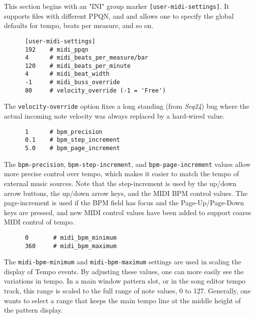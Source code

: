    This section begins with an
   "INI" group marker \texttt{[user-midi-settings]}.
   It supports files with different PPQN, and and allows one to specify the
   global defaults for tempo, beats per measure, and so on.

   \begin{verbatim}
      [user-midi-settings]
      192    # midi_ppqn
      4      # midi_beats_per_measure/bar
      120    # midi_beats_per_minute
      4      # midi_beat_width
      -1     # midi_buss_override
      80     # velocity_override (-1 = 'Free')
   \end{verbatim}

   The \texttt{velocity-override} option fixes a long standing (from
   \textsl{Seq24}) bug where the actual incoming note velocity was always
   replaced by a hard-wired value.

   \begin{verbatim}
      1      # bpm_precision
      0.1    # bpm_step_increment
      5.0    # bpm_page_increment
   \end{verbatim}

   The \texttt{bpm-precision}, \texttt{bpm-step-increment}, and
   \texttt{bpm-page-increment} values allow more precise control over tempo,
   which makes it easier to match the tempo of external music sources.  Note
   that the step-increment is used by the up/down arrow buttons, the up/down
   arrow keys, and the MIDI BPM control values.  The page-increment is used
   if the BPM field has focus and the Page-Up/Page-Down keys are pressed,
   and new MIDI control values have been added to support coarse MIDI
   control of tempo.

   \begin{verbatim}
      0       # midi_bpm_minimum
      360     # midi_bpm_maximum
   \end{verbatim}

   The \texttt{midi-bpm-minimum} and \texttt{midi-bpm-maximum} settings
   are used in scaling the display of Tempo events.
   By adjusting these values, one can more easily see the variations in
   tempo.  In a main window pattern slot, or in the song editor tempo track,
   this range is scaled to the full range of note values, 0 to 127.
   Generally, one wants to select a range that keeps the main tempo line at
   the middle height of the pattern display.

